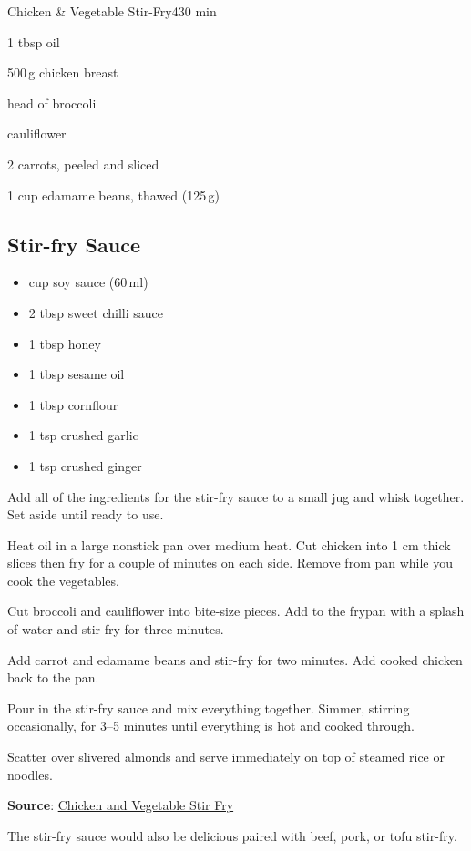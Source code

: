\begin{recipebox}{Chicken \& Vegetable Stir-Fry}{4}{30 min}
\begin{ingredients}
  \item 1 tbsp oil
  \item 500\,g chicken breast
  \item {} head of broccoli
  \item {} cauliflower
  \item 2 carrots, peeled and sliced
  \item 1 cup edamame beans, thawed (125\,g)
\end{ingredients}

\subsection*{Stir-fry Sauce}
\begin{itemize}[leftmargin=2em]
  \item {} cup soy sauce (60\,ml)
  \item 2 tbsp sweet chilli sauce
  \item 1 tbsp honey
  \item 1 tbsp sesame oil
  \item 1 tbsp cornflour
  \item 1 tsp crushed garlic
  \item 1 tsp crushed ginger
\end{itemize}

\begin{method}
  \item Add all of the ingredients for the stir-fry sauce to a small jug and whisk together. Set aside until ready to use.
  \item Heat oil in a large nonstick pan over medium heat. Cut chicken into 1 cm thick slices then fry for a couple of minutes on each side. Remove from pan while you cook the vegetables.
  \item Cut broccoli and cauliflower into bite-size pieces. Add to the frypan with a splash of water and stir-fry for three minutes.
  \item Add carrot and edamame beans and stir-fry for two minutes. Add cooked chicken back to the pan.
  \item Pour in the stir-fry sauce and mix everything together. Simmer, stirring occasionally, for 3–5 minutes until everything is hot and cooked through.
  \item Scatter over slivered almonds and serve immediately on top of steamed rice or noodles.
\end{method}

\textbf{Source}: \href{https://vjcooks.com/chicken-stirfry/#mv-creation-173-jtr}{Chicken and Vegetable Stir Fry}

\begin{notes}
The stir-fry sauce would also be delicious paired with beef, pork, or tofu stir-fry.
\end{notes}
\end{recipebox}